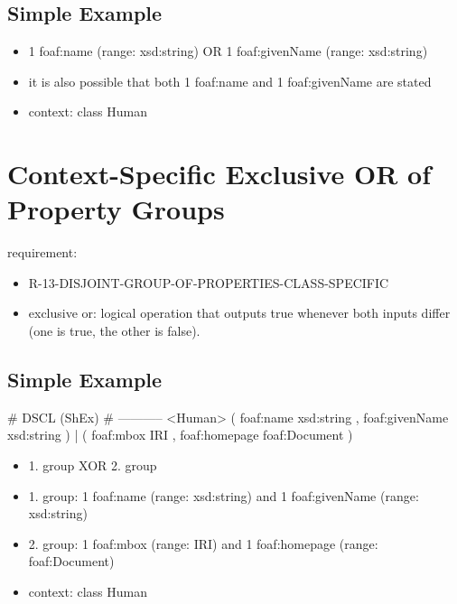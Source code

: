 \documentclass{llncs}
\begin{document}
\subsection{Simple Example}

\begin{itemize}
	\item 1 foaf:name (range: xsd:string) OR 1 foaf:givenName (range: xsd:string)
	\item it is also possible that both 1 foaf:name and 1 foaf:givenName are stated
	\item context: class Human
\end{itemize}

\section{Context-Specific Exclusive OR of Property Groups}

requirement:

\begin{itemize}
	\item R-13-DISJOINT-GROUP-OF-PROPERTIES-CLASS-SPECIFIC
\end{itemize}



\begin{itemize}
	\item exclusive or: logical operation that outputs true whenever both inputs differ (one is true, the other is false).
\end{itemize}

\subsection{Simple Example}

\begin{ex}
# DSCL (ShEx)
# -----------
<Human> { 
    (  
        foaf:name xsd:string ,
        foaf:givenName xsd:string ) 
    |
    (
        foaf:mbox IRI ,
        foaf:homepage foaf:Document ) }
\end{ex}

\begin{itemize}
  \item 1. group XOR 2. group
	\item 1. group: 1 foaf:name (range: xsd:string) and 1 foaf:givenName (range: xsd:string)
	\item 2. group: 1 foaf:mbox (range: IRI) and 1 foaf:homepage (range: foaf:Document) 
	\item context: class Human
\end{itemize}
\end{document}
